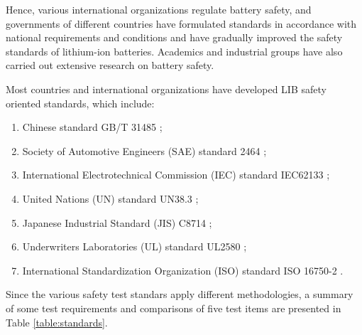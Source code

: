 Hence, various international organizations regulate battery safety, and governments of different countries have formulated standards in accordance with national requirements and conditions and have gradually improved the safety standards of lithium-ion batteries. Academics and industrial groups have also carried out extensive research on battery safety.

Most countries and international organizations have developed LIB safety oriented standards, which include:
\begin{enumerate}
    \item Chinese standard GB/T 31485 \cite{GBT31485};
    \item Society of Automotive Engineers (SAE) standard 2464 \cite{SAE2464};
    \item International Electrotechnical Commission (IEC) standard IEC62133 \cite{IEC62133-2};
    \item United Nations (UN) standard UN38.3 \cite{UN38.3};
    \item Japanese Industrial Standard (JIS) C8714 \cite{JISC8714};
    \item Underwriters Laboratories (UL) standard UL2580 \cite{UL2580};
    \item International Standardization Organization (ISO) standard ISO 16750-2 \cite{ISO16750-2:2023}.
\end{enumerate}

Since the various safety test standars apply different methodologies, a summary of some test requirements and comparisons of five test items are presented in Table \ref{table:standards}.


